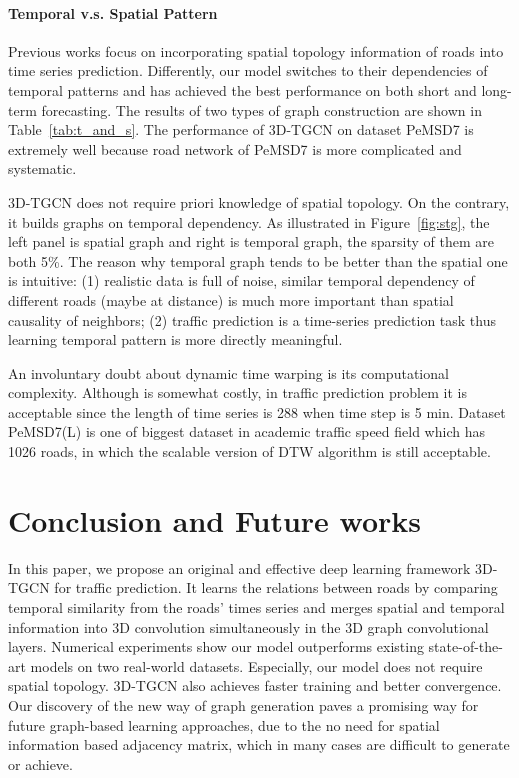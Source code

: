 \documentclass{article}
\begin{document}
\paragraph{Temporal v.s. Spatial Pattern} 
Previous works  focus on incorporating spatial topology information of roads into time series prediction. Differently, our model switches to their dependencies of temporal patterns and has achieved the best performance on both short and long-term forecasting. The results of two types of graph construction are shown in Table~\ref{tab:t_and_s}. The performance of 3D-TGCN on dataset PeMSD7 is extremely well because road network of PeMSD7 is more complicated and systematic.

3D-TGCN does not require priori knowledge of spatial topology. On the contrary, it builds graphs on temporal dependency. As illustrated in Figure~\ref{fig:stg}, the left panel is spatial graph and right is temporal graph, the sparsity of them are both 5\%. The reason why temporal graph tends to be better than the spatial one is intuitive: (1) realistic data is full of noise, similar temporal dependency of different roads (maybe at distance) is much more important than spatial causality of neighbors; (2) traffic prediction is a time-series prediction task thus learning temporal pattern is more directly meaningful. 

An involuntary doubt about dynamic time warping is its computational complexity. Although  is somewhat costly, in traffic prediction problem it is acceptable since the length of time series is 288 when time step is 5 min. Dataset PeMSD7(L) is one of biggest dataset in academic traffic speed field which has 1026 roads, in which the scalable version of DTW algorithm is still acceptable.


\section{Conclusion and Future works}
In this paper, we propose an original and effective deep learning framework 3D-TGCN for traffic prediction. It learns the relations between roads by comparing temporal similarity from the roads' times series and merges spatial and temporal information into 3D convolution simultaneously in the 3D graph convolutional layers. Numerical experiments show our model outperforms existing state-of-the-art models on two real-world datasets. Especially, our model does not require spatial topology. 3D-TGCN also achieves faster training  and better convergence. Our discovery of the new way of graph generation paves a  promising way for future graph-based learning approaches, due to the no need for spatial information based adjacency matrix, which in many cases are difficult to generate or achieve.  

\appendix



\end{document}
